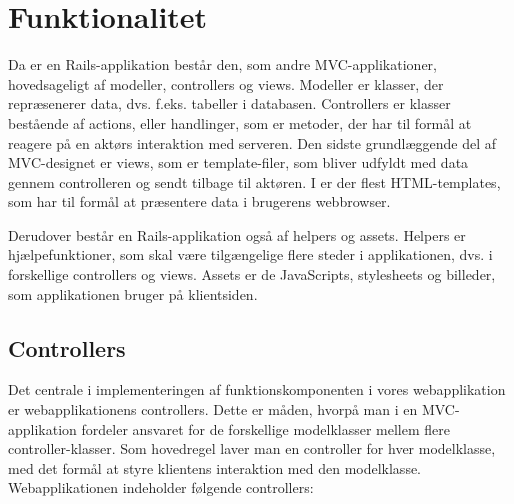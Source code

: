 \section{Funktionalitet}
\label{sec:funktionalitet}

Da {\Foodl} er en Rails-applikation består den, som andre MVC-applikationer, hovedsageligt af modeller, controllers og views. Modeller er klasser, der repræsenerer data, dvs. f.eks. tabeller i databasen. Controllers er klasser bestående af actions, eller handlinger, som er metoder, der har til formål at reagere på en aktørs interaktion med serveren. Den sidste grundlæggende del af MVC-designet er views, som er template-filer, som bliver udfyldt med data gennem controlleren og sendt tilbage til aktøren. I \Foodl{} er der flest HTML-templates, som har til formål at præsentere data i brugerens webbrowser.

Derudover består en Rails-applikation også af helpers og assets. Helpers er hjælpefunktioner, som skal være tilgængelige flere steder i applikationen, dvs. i forskellige controllers og views. Assets er de JavaScripts, stylesheets og billeder, som applikationen bruger på klientsiden. 

\subsection{Controllers}
\label{sec:controllers}

Det centrale i implementeringen af funktionskomponenten i vores webapplikation er webapplikationens controllers. Dette er måden, hvorpå man i en MVC-applikation fordeler ansvaret for de forskellige modelklasser mellem flere controller-klasser. Som hovedregel laver man en controller for hver modelklasse, med det formål at styre klientens interaktion med den modelklasse. Webapplikationen indeholder følgende controllers:

